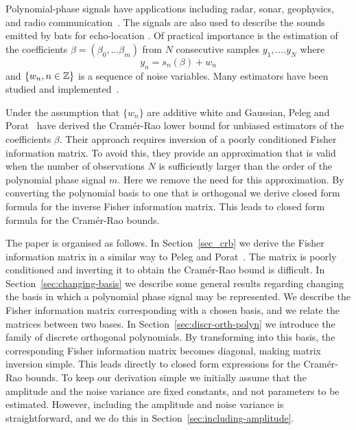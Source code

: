 \documentclass[journal,10pt]{IEEEtran}
\begin{document}
Polynomial-phase signals have applications including radar, sonar, geophysics, and radio communication~\cite{Angeby_estimating_2000}.  The signals are also used to describe the sounds emitted by bats for echo-location \cite{Peleg_DPT_1995}.  Of practical importance is the estimation of the coefficients $\beta = (\beta_0, \dots \beta_m)$ from $N$ consecutive samples $y_1, \dots. y_N$ where 
\[
y_n = s_n(\beta) + w_n
\]
and $\{w_n, n \in {\mathbb Z}\}$ is a sequence of noise variables.  Many estimators have been studied and implemented~\cite{Peleg_DPT_1995, Angeby_estimating_2000, Djuric_phase_unwrap_chirp_1990, Oshea_iterative_1996, Barbarossa_analysis_of_PPS_1997, Slocumb_polynomial_1994, Morelande_bayes_unwrapping_2008, Kitchen_polyphase_unwrapping_1994,Francos_2dpolyest_1998}.

Under the assumption that $\{w_n\}$ are additive white and Gaussian, Peleg and Porat~\cite{Peleg1991_CRB_PPS_1991} have derived the Cram\'{e}r-Rao lower bound for unbiased estimators of the coefficients $\beta$.  Their approach requires inversion of a poorly conditioned Fisher information matrix.  To avoid this, they provide an approximation that is valid when the number of observations $N$ is sufficiently larger than the order of the polynomial phase signal $m$.  Here we remove the need for this approximation.  By converting the polynomial basis to one that is orthogonal we derive closed form formula for the inverse Fisher information matrix.  This leads to closed form formula for the Cram\'{e}r-Rao bounds.  %

The paper is organised as follows.  In Section~\ref{sec_crb} we derive the Fisher information matrix in a similar way to Peleg and Porat~\cite{Peleg1991_CRB_PPS_1991}.  The matrix is poorly conditioned and inverting it to obtain the Cram\'{e}r-Rao bound is difficult.  In Section~\ref{sec:changing-basis} we describe some general results regarding changing the basis in which a polynomial phase signal may be represented.  We describe the Fisher information matrix corresponding with a chosen basis, and we relate the matrices between two bases.  In Section~\ref{sec:discr-orth-polyn} we introduce the family of discrete orthogonal polynomials.  By transforming into this basis, the corresponding Fisher information matrix becomes diagonal, making matrix inversion simple.  This leads directly to closed form expressions for the Cram\'{e}r-Rao bounds.  To keep our derivation simple we initially assume that the amplitude and the noise variance are fixed constants, and not parameters to be estimated.  However, including the amplitude and noise variance is straightforward, and we do this in Section~\ref{sec:including-amplitude}.  %
\end{document}
